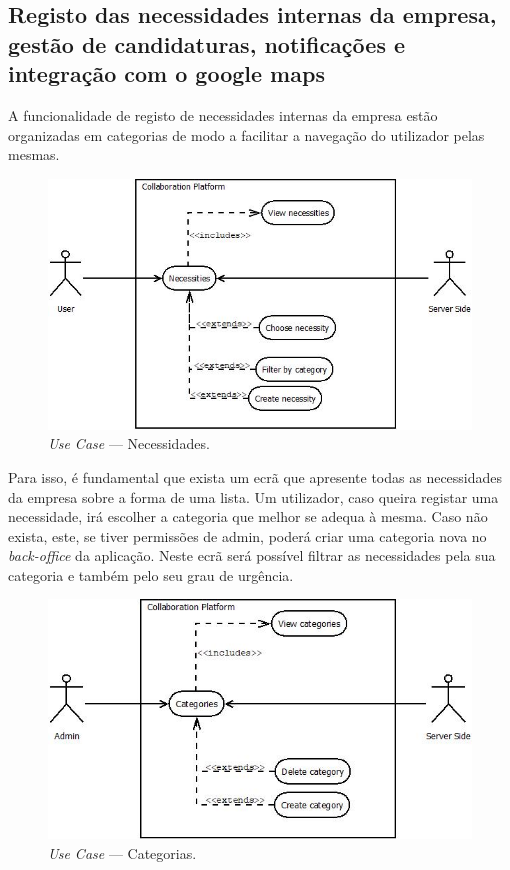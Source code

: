 \subsection{Registo das necessidades internas da empresa, gestão de candidaturas, notificações e integração com o google maps}\label{subsec:necessitiesCandidatesNotificationsGoogleMaps}

A funcionalidade de registo de necessidades internas da empresa estão organizadas em categorias de modo a facilitar a navegação do utilizador pelas mesmas.

\begin{figure}[H]
    \centering
    \includegraphics[scale=0.8]{figures/Necessities.jpeg}
    \caption{\textit{Use Case} --- Necessidades.}\label{fig:uc:necessities}
\end{figure}

Para isso, é fundamental que exista um ecrã que apresente todas as necessidades da empresa sobre a forma de uma lista. 
Um utilizador, caso queira registar uma necessidade, irá escolher a categoria que melhor se adequa à mesma. 
Caso não exista, este, se tiver permissões de admin, poderá criar uma categoria nova no \textit{back-office} da aplicação. 
Neste ecrã será possível filtrar as necessidades pela sua categoria e também pelo seu grau de urgência.

\begin{figure}[H]
    \centering
    \includegraphics[scale=0.8]{figures/Categories use case.jpeg}
    \caption{\textit{Use Case} --- Categorias.}\label{fig:uc:categories}
\end{figure}

